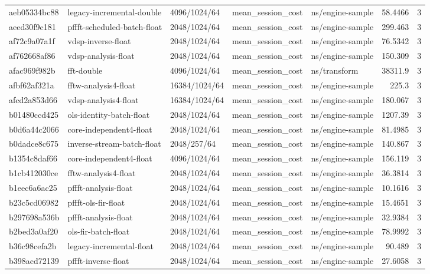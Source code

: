 \begin{longtable}{lllllrr}
aeb05334bc88 & legacy-incremental-double & 4096/1024/64 & mean\_session\_cost & ns/engine-sample & 58.4466 & 3 \\
aeed30f9c181 & pffft-scheduled-batch-float & 2048/1024/64 & mean\_session\_cost & ns/engine-sample & 299.463 & 3 \\
af72c9a07a1f & vdsp-inverse-float & 2048/1024/64 & mean\_session\_cost & ns/engine-sample & 76.5342 & 3 \\
af762668af86 & vdsp-analysis-float & 2048/1024/64 & mean\_session\_cost & ns/engine-sample & 150.309 & 3 \\
afac969f982b & fft-double & 4096/1024/64 & mean\_session\_cost & ns/transform & 38311.9 & 3 \\
afbf62af321a & fftw-analysis4-float & 16384/1024/64 & mean\_session\_cost & ns/engine-sample & 225.3 & 3 \\
afcd2a853d66 & vdsp-analysis4-float & 16384/1024/64 & mean\_session\_cost & ns/engine-sample & 180.067 & 3 \\
b01480ccd425 & ols-identity-batch-float & 2048/1024/64 & mean\_session\_cost & ns/engine-sample & 1207.39 & 3 \\
b0d6a44c2066 & core-independent4-float & 2048/1024/64 & mean\_session\_cost & ns/engine-sample & 81.4985 & 3 \\
b0dadce8c675 & inverse-stream-batch-float & 2048/257/64 & mean\_session\_cost & ns/engine-sample & 140.867 & 3 \\
b1354c8daf66 & core-independent4-float & 4096/1024/64 & mean\_session\_cost & ns/engine-sample & 156.119 & 3 \\
b1cb412030ce & fftw-analysis4-float & 2048/1024/64 & mean\_session\_cost & ns/engine-sample & 36.3814 & 3 \\
b1eec6a6ac25 & pffft-analysis-float & 2048/1024/64 & mean\_session\_cost & ns/engine-sample & 10.1616 & 3 \\
b23c5cd06982 & pffft-ols-fir-float & 2048/1024/64 & mean\_session\_cost & ns/engine-sample & 15.4651 & 3 \\
b297698a536b & pffft-analysis-float & 2048/1024/64 & mean\_session\_cost & ns/engine-sample & 32.9384 & 3 \\
b2bed3a0af20 & ols-fir-batch-float & 2048/1024/64 & mean\_session\_cost & ns/engine-sample & 78.9992 & 3 \\
b36c98cefa2b & legacy-incremental-float & 2048/1024/64 & mean\_session\_cost & ns/engine-sample & 90.489 & 3 \\
b398acd72139 & pffft-inverse-float & 2048/1024/64 & mean\_session\_cost & ns/engine-sample & 27.6058 & 3 \\

\end{longtable}
